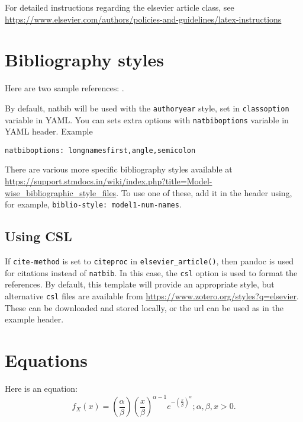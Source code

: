 \documentclass[
  authoryear,
  preprint,
  3p]{elsarticle}
\begin{document}
For detailed instructions regarding the elsevier article class, see
\url{https://www.elsevier.com/authors/policies-and-guidelines/latex-instructions}

\hypertarget{bibliography-styles}{%
\section{Bibliography styles}\label{bibliography-styles}}

Here are two sample references: \citet{Feynman1963118}
\citet{Dirac1953888}.

By default, natbib will be used with the \texttt{authoryear} style, set
in \texttt{classoption} variable in YAML. You can sets extra options
with \texttt{natbiboptions} variable in YAML header. Example

\begin{verbatim}
natbiboptions: longnamesfirst,angle,semicolon
\end{verbatim}

There are various more specific bibliography styles available at
\url{https://support.stmdocs.in/wiki/index.php?title=Model-wise_bibliographic_style_files}.
To use one of these, add it in the header using, for example,
\texttt{biblio-style:\ model1-num-names}.

\hypertarget{using-csl}{%
\subsection{Using CSL}\label{using-csl}}

If \texttt{cite-method} is set to \texttt{citeproc} in
\texttt{elsevier\_article()}, then pandoc is used for citations instead
of \texttt{natbib}. In this case, the \texttt{csl} option is used to
format the references. By default, this template will provide an
appropriate style, but alternative \texttt{csl} files are available from
\url{https://www.zotero.org/styles?q=elsevier}. These can be downloaded
and stored locally, or the url can be used as in the example header.

\hypertarget{equations}{%
\section{Equations}\label{equations}}

Here is an equation: \[ 
  f_{X}(x) = \left(\frac{\alpha}{\beta}\right)
  \left(\frac{x}{\beta}\right)^{\alpha-1}
  e^{-\left(\frac{x}{\beta}\right)^{\alpha}}; 
  \alpha,\beta,x > 0 .
\]
\end{document}
